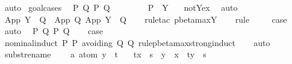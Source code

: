 \begin{isabellebody}
\ auto{\isacharbrackleft}{}{\isacharbrackright}\isanewline
{}\isamarkupfalse%
\ goal{\isacharunderscore}cases\isanewline
{}\isamarkupfalse%
\ {\isacharparenleft}{}\ P\ Q\ P{\isacharprime}\ Q{\isacharprime}{\isacharparenright}\isanewline
\ \ \isamarkupfalse%
\ \isamarkupfalse%
\ {\isasymsigma}\ \ {}{\isacharcolon}\ {\isachardoublequoteopen}P\ {\isacharequal}\ Y\ {\isasymsigma}{\isachardoublequoteclose}\ \isamarkupfalse%
\ not{\isacharunderscore}Y{\isacharunderscore}ex\ \isamarkupfalse%
\ auto\isanewline
\ \ \isamarkupfalse%
\ {\isachardoublequoteopen}App\ {\isacharparenleft}Y\ {\isasymsigma}{\isacharparenright}\ Q\ {\isachargreater}{\isachargreater}{\isachargreater}\ App\ Q{\isacharprime}\ {\isacharparenleft}App\ {\isacharparenleft}Y\ {\isasymsigma}{\isacharparenright}\ Q{\isacharprime}{\isacharparenright}{\isachardoublequoteclose}\isanewline
\ \ \isamarkupfalse%
\ {\isacharparenleft}rule{\isacharunderscore}tac\ pbeta{\isacharunderscore}max{\isachardot}Y{\isacharparenright}\isanewline
\ \ \isamarkupfalse%
\ {\isacharparenleft}rule\ {}{\isacharparenleft}{}{\isacharparenright}{\isacharparenright}\isanewline
\ \ \isamarkupfalse%
\ {\isacharquery}case\ \isamarkupfalse%
\ {}\ \isamarkupfalse%
\ auto\isanewline
{}\isamarkupfalse%
\isanewline
{}\isamarkupfalse%
\ {\isacharparenleft}{}\ P\ Q\ P{\isacharprime}\ Q{\isacharprime}{\isacharparenright}\isanewline
\ \ \isamarkupfalse%
\ {\isacharquery}case\isanewline
\ \ \isamarkupfalse%
\ {\isacharparenleft}nominal{\isacharunderscore}induct\ P\ P{\isacharprime}\ avoiding{\isacharcolon}\ Q\ Q{\isacharprime}\ rule{\isacharcolon}pbeta{\isacharunderscore}max{\isachardot}strong{\isacharunderscore}induct{\isacharparenright}\isanewline
\ \ \isamarkupfalse%
\ auto\isanewline
{}\isamarkupfalse%
%
\endisatagproof
{\isafoldproof}%
%
\isadelimproof
%
\endisadelimproof
%
\isamarkuptrue%
\isamarkupfalse%
\ subst{\isacharunderscore}rename{\isacharcolon}\ \isanewline
\ \ \ a{\isacharcolon}\ {\isachardoublequoteopen}atom\ y\ {\isasymsharp}\ t{\isachardoublequoteclose}\isanewline
\ \ \ {\isachardoublequoteopen}t{\isacharbrackleft}x\ {\isacharcolon}{\isacharcolon}{\isacharequal}\ s{\isacharbrackright}\ {\isacharequal}\ {\isacharparenleft}{\isacharparenleft}y\ {\isasymleftrightarrow}\ x{\isacharparenright}\ {\isasymbullet}\ t{\isacharparenright}{\isacharbrackleft}y\ {\isacharcolon}{\isacharcolon}{\isacharequal}\ s{\isacharbrackright}{\isachardoublequoteclose}\isanewline

\end{isabellebody}
